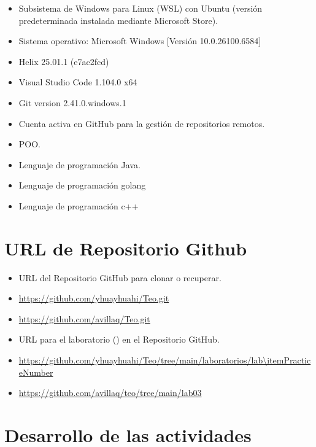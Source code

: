 \begin{itemize}
    \item Subsistema de Windows para Linux (WSL) con Ubuntu (versión predeterminada instalada mediante Microsoft Store).
    \item Sistema operativo: Microsoft Windows [Versión 10.0.26100.6584]
    \item Helix 25.01.1 (e7ac2fcd)
    \item Visual Studio Code 1.104.0 x64
    \item Git version 2.41.0.windows.1
    \item Cuenta activa en GitHub para la gestión de repositorios remotos.
    \item POO.
    \item Lenguaje de programación Java.
    \item Lenguaje de programación golang
    \item Lenguaje de programación c++
\end{itemize}




\section{URL de Repositorio Github}

\begin{itemize}
    \item URL del Repositorio GitHub para clonar o recuperar.
    \item \url{https://github.com/yhuayhuahi/Teo.git}
    \item \url{https://github.com/avillaq/Teo.git}
    \item URL para el laboratorio (\itemPracticeNumber) en el Repositorio GitHub.
    \item \url{https://github.com/yhuayhuahi/Teo/tree/main/laboratorios/lab\itemPracticeNumber}
    \item \url{https://github.com/avillaq/teo/tree/main/lab03}
\end{itemize}




\section{Desarrollo de las actividades}

